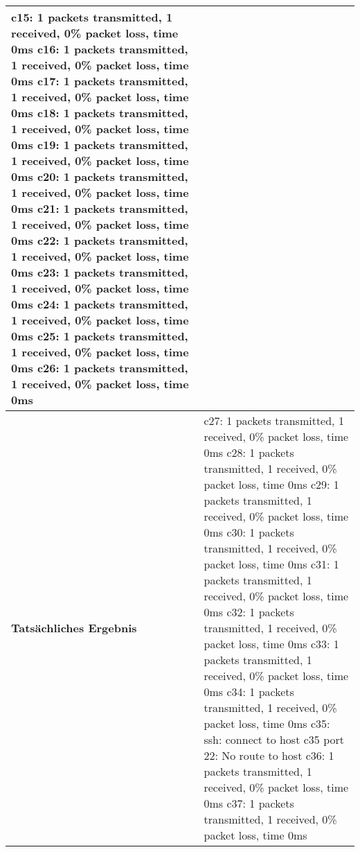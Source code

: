 \begin{longtable}{p{4.5cm}p{11.5cm}}
c15: 1 packets transmitted, 1 received, 0\% packet loss, time 0ms \newline
c16: 1 packets transmitted, 1 received, 0\% packet loss, time 0ms \newline
c17: 1 packets transmitted, 1 received, 0\% packet loss, time 0ms \newline 
c18: 1 packets transmitted, 1 received, 0\% packet loss, time 0ms \newline
c19: 1 packets transmitted, 1 received, 0\% packet loss, time 0ms \newline
c20: 1 packets transmitted, 1 received, 0\% packet loss, time 0ms \newline
c21: 1 packets transmitted, 1 received, 0\% packet loss, time 0ms \newline
c22: 1 packets transmitted, 1 received, 0\% packet loss, time 0ms \newline
c23: 1 packets transmitted, 1 received, 0\% packet loss, time 0ms \newline
c24: 1 packets transmitted, 1 received, 0\% packet loss, time 0ms \newline 
c25: 1 packets transmitted, 1 received, 0\% packet loss, time 0ms \newline
c26: 1 packets transmitted, 1 received, 0\% packet loss, time 0ms \newline
\\\hline
\cellcolor{heading}\textbf{Tatsächliches Ergebnis} & 
c27: 1 packets transmitted, 1 received, 0\% packet loss, time 0ms \newline
c28: 1 packets transmitted, 1 received, 0\% packet loss, time 0ms \newline
c29: 1 packets transmitted, 1 received, 0\% packet loss, time 0ms \newline
c30: 1 packets transmitted, 1 received, 0\% packet loss, time 0ms \newline
c31: 1 packets transmitted, 1 received, 0\% packet loss, time 0ms \newline
c32: 1 packets transmitted, 1 received, 0\% packet loss, time 0ms \newline
c33: 1 packets transmitted, 1 received, 0\% packet loss, time 0ms \newline
c34: 1 packets transmitted, 1 received, 0\% packet loss, time 0ms \newline
c35: ssh: connect to host c35 port 22: No route to host
c36: 1 packets transmitted, 1 received, 0\% packet loss, time 0ms \newline
c37: 1 packets transmitted, 1 received, 0\% packet loss, time 0ms \newline

\end{longtable}
